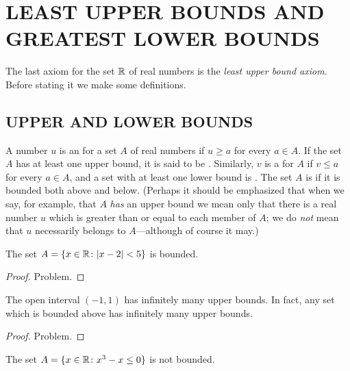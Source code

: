 \chapter{LEAST UPPER BOUNDS AND GREATEST LOWER BOUNDS}\label{lub}

The last axiom for the set $\mathbb{R}$ of real numbers is the \emph{least
upper bound axiom}.  Before stating it we make some definitions.



\section{UPPER AND LOWER BOUNDS}
\begin{defn}  A number $u$ is an
 for a set $A$ of real numbers if $u \ge a$ for every $a \in A$.  If the set
$A$ has at least one upper bound, it is said to be
.  Similarly, $v$ is a
 for $A$ if $v \le a$ for every $a \in A$, and a set with at least one lower
bound is
.  The set $A$ is
 if it is bounded both above and below. (Perhaps it should be emphasized that when
we say, for example, that $A$ \emph{has} an upper bound we mean only that there is a real
number $u$ which is greater than or equal to each member of $A$; we do \emph{not} mean that
$u$ necessarily belongs to $A$---although of course it may.)
\end{defn}

\begin{exam} The set $A = \{x \in \mathbb{R} \colon \lvert x - 2\rvert < 5 \}$ is bounded.
\end{exam}

\begin{proof} Problem.  \ns  \end{proof}

\begin{exam} The open interval $(-1,1)$ has infinitely many upper bounds.  In fact, any set
which is bounded above has infinitely many upper bounds.
\end{exam}

\begin{proof} Problem.   \ns  \end{proof}

\begin{exam} The set $A = \{x \in \mathbb{R} \colon x^3 - x \le 0\}$ is not bounded.
\end{exam}

